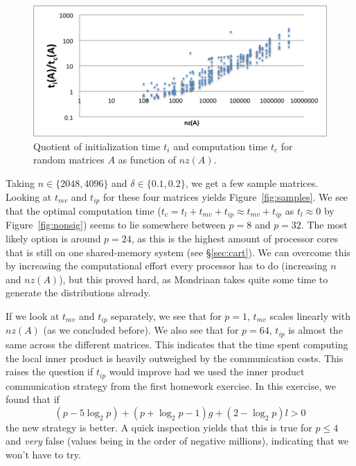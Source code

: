 \documentclass[11pt]{amsart}
\theoremstyle{definition}
\begin{document}
\begin{figure}
  \includegraphics[width=\linewidth]{quotient.png}
  \caption{Quotient of initialization time $t_i$ and computation time $t_c$ for random matrices $A$ as function of $nz(A)$.}
  \label{fig:quotient}
\end{figure}

Taking $n \in \{2048, 4096\}$ and $\delta \in \{0.1, 0.2\}$, we get a few sample matrices. Looking at $t_{mv}$ and $t_{ip}$ for these four matrices yields Figure~\ref{fig:samples}. We see that the optimal computation time ($t_c = t_l + t_{mv} + t_{ip} \approx t_{mv} + t_{ip}$ as $t_l \approx 0$ by Figure~\ref{fig:nonsig}) seems to lie somewhere between $p=8$ and $p=32$. The most likely option is around $p=24$, as this is the highest amount of processor cores that is still on one shared-memory system (see \S \ref{sec:cart}). We can overcome this by increasing the computational effort every processor has to do (increasing $n$ and $nz(A)$), but this proved hard, as Mondriaan takes quite some time to generate the distributions already.

If we look at $t_{mv}$ and $t_{ip}$ separately, we see that for $p=1$, $t_{mv}$ scales linearly with $nz(A)$ (as we concluded before). We also see that for $p=64$, $t_{ip}$ is almost the same across the different matrices. This indicates that the time spent computing the local inner product is heavily outweighed by the communication costs. This raises the question if $t_{ip}$ would improve had we used the inner product communication strategy from the first homework exercise. \cite{TODOHUISWERK} In this exercise, we found that if
\[
  (p - 5\log_2 p) + (p + \log_2 p - 1)g + (2-\log_2 p)l > 0
\]
the new strategy is better. A quick inspection yields that this is true for $p \leq 4$ and \emph{very} false (values being in the order of negative millions), indicating that we won't have to try.
\end{document}
